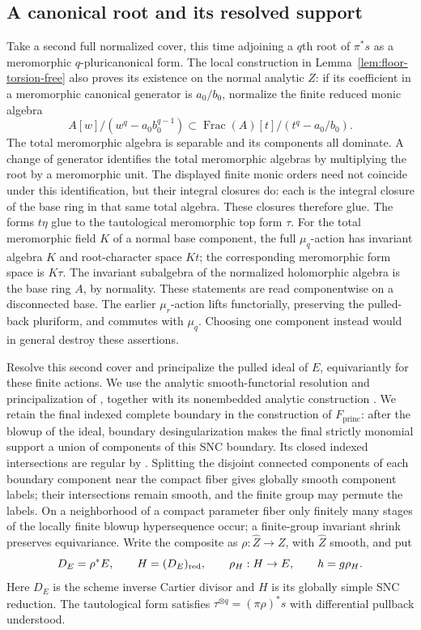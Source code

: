 \subsection{A canonical root and its resolved support}

Take a second full normalized cover, this time adjoining a \(q\)th root
of \(\pi^*s\) as a meromorphic \(q\)-pluricanonical form.  The local
construction in Lemma~\ref{lem:floor-torsion-free} also proves its
existence on the normal analytic \(Z\): if its coefficient in a
meromorphic canonical generator is \(a_0/b_0\), normalize the finite
reduced monic algebra
\[
 A[w]/(w^q-a_0b_0^{q-1})
 \subset \operatorname{Frac}(A)[t]/(t^q-a_0/b_0).
\]
The total meromorphic algebra is separable and its components all dominate.
A change of generator identifies the total meromorphic algebras by
multiplying the root by a meromorphic unit.  The displayed finite monic
orders need not coincide under this identification, but their integral
closures do: each is the integral closure of the base ring in that same
total algebra.  These closures therefore glue.  The forms
\(t\eta\) glue to the tautological meromorphic top form \(\tau\).
For the total meromorphic field \(K\) of a normal base component, the
full \(\mu_q\)-action has invariant algebra \(K\) and root-character
space \(Kt\); the corresponding meromorphic form space is \(K\tau\).
The invariant subalgebra of the normalized holomorphic algebra is the
base ring \(A\), by normality.  These statements are read componentwise
on a disconnected base.
The earlier \(\mu_r\)-action lifts functorially, preserving the pulled-back
pluriform, and commutes with \(\mu_q\).  Choosing one component instead
would in general destroy these assertions.

Resolve this second cover and principalize the pulled ideal of \(E\),
equivariantly for these finite actions.  We use the analytic
smooth-functorial resolution and principalization of
\cite[Theorems~1.1.11 and~1.1.13]{Temkin2017}, together with its nonembedded
analytic construction \cite[Sections~5.2.2 and~5.3.2]{TemkinNonembedded}.
We retain the final indexed complete boundary in the construction of
\(F_{\mathrm{princ}}\): after the blowup of the ideal, boundary
desingularization makes the final strictly monomial support a union of
components of this SNC boundary.  Its closed indexed intersections are
regular by \cite[Lemma~2.1.10]{Temkin2017}.  Splitting the disjoint
connected components of each boundary component near the compact fiber
gives globally smooth component labels; their intersections remain
smooth, and the finite group may permute the labels.  On a neighborhood of a compact
parameter fiber only finitely many stages of the locally finite blowup
hypersequence occur; a finite-group invariant shrink preserves equivariance.
Write the composite as \(\rho:\widehat Z\to Z\), with \(\widehat Z\)
smooth, and put
\begin{equation}\label{eq:resolved-boundary}
 D_E=\rho^*E,\qquad H=(D_E)_{\mathrm{red}},\qquad
 \rho_H:H\to E,\qquad h=g\rho_H.
\end{equation}
Here \(D_E\) is the scheme inverse Cartier divisor and \(H\) is its
globally simple SNC reduction.  The tautological form satisfies
\(\tau^{\otimes q}=(\pi\rho)^*s\) with differential pullback understood.

